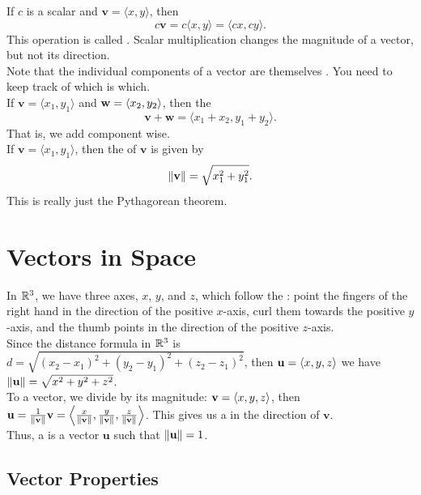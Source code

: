 If \(c\) is a scalar and \(\mathbf{v} = \langle x,y\rangle\), then
\[
    c\mathbf{v} = c\langle x,y\rangle = \langle cx,cy\rangle.
\]
This operation is called . Scalar multiplication changes the magnitude of a vector, but not its direction. \\

Note that the individual components of a vector are themselves . You need to keep track of which is which. \\

If \(\mathbf{v} = \langle x_{1},y_{1} \rangle\) and \(\mathbf{w} = \left\langle x_{2},y_{2} \right\rangle\), then the  
\[
    \mathbf{v} + \mathbf{w} = \langle x_{1}+x_{2},y_{1}+y_{2}\rangle.
\] 
That is, we add component wise. \\

If \(\mathbf{v} = \langle x_{1},y_{1} \rangle\), then the  of \(\mathbf{v}\) is given by
\[
    \left\lVert \mathbf{v}\right\rVert = \sqrt{x_{1}^{2}+y_{1}^{2}}.
\]
This is really just the Pythagorean theorem.

\section{Vectors in Space}

In \(\mathbb{R}^{3}\), we have three axes, \(x\), \(y\), and \(z\), which follow the : point the fingers of the right hand in the direction of the positive \(x\)-axis, curl them towards the positive \(y\)-axis, and the thumb points in the direction of the positive \(z\)-axis. \\

Since the distance formula in \(\mathbb{R}^{3}\) is \(d = \sqrt{(x_{2} - x_{1})^{2} + (y_{2} - y_{1})^{2} + (z_{2} - z_{1})^{2}}\), then \(\mathbf{u} = \left\langle x,y,z \right\rangle\) we have \(\left\lVert \mathbf{u}\right\rVert = \sqrt{x^{2} + y^{2} + z^{2}}\). \\

To  a vector, we divide by its magnitude: \(\mathbf{v} = \left\langle x,y,z \right\rangle\), then \(\mathbf{u} = \frac{1}{\left\lVert \mathbf{v}\right\rVert}\mathbf{v} = \left\langle \frac{x}{\left\lVert \mathbf{v}\right\rVert},\frac{y}{\left\lVert \mathbf{v}\right\rVert},\frac{z}{\left\lVert \mathbf{v}\right\rVert} \right\rangle\). This gives us a  in the direction of \(\mathbf{v}\). \\

Thus, a  is a vector \(\mathbf{u}\) such that \(\left\lVert \mathbf{u}\right\rVert = 1\). \\

\subsection{Vector Properties}

